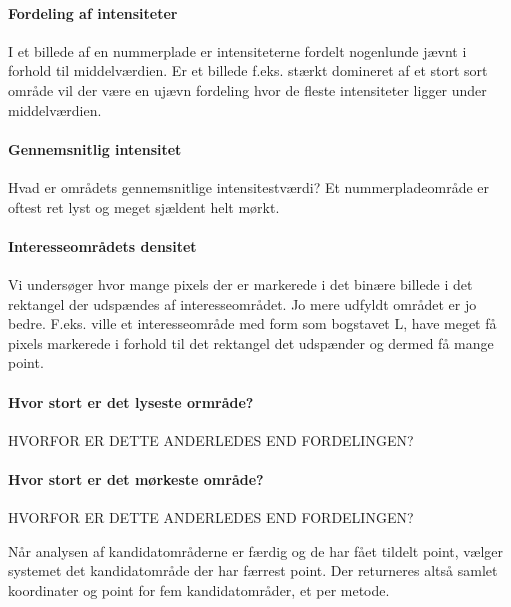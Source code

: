\paragraph*{Fordeling af intensiteter}
I et billede af en nummerplade er intensiteterne fordelt nogenlunde jævnt i forhold til middelværdien. Er et billede f.eks. stærkt domineret af et stort sort område vil der være en ujævn fordeling hvor de fleste intensiteter ligger under middelværdien.

\paragraph*{Gennemsnitlig intensitet}
Hvad er områdets gennemsnitlige intensitestværdi? Et nummerpladeområde er oftest ret lyst og meget sjældent helt mørkt. 

\paragraph*{Interesseområdets densitet}
Vi undersøger hvor mange pixels der er markerede i det binære billede i det rektangel der udspændes af interesseområdet. Jo mere udfyldt området er jo bedre. F.eks. ville et interesseområde med form som bogstavet L, have meget få pixels markerede i forhold til det rektangel det udspænder og dermed få mange point.


\paragraph*{Hvor stort er det lyseste ormråde?}
HVORFOR ER DETTE ANDERLEDES END FORDELINGEN?

\paragraph*{Hvor stort er det mørkeste område?}
HVORFOR ER DETTE ANDERLEDES END FORDELINGEN?

Når analysen af kandidatområderne er færdig og de har fået tildelt point, vælger systemet det kandidatområde der har færrest point. Der returneres altså samlet koordinater og point for  fem kandidatområder, et per metode.


